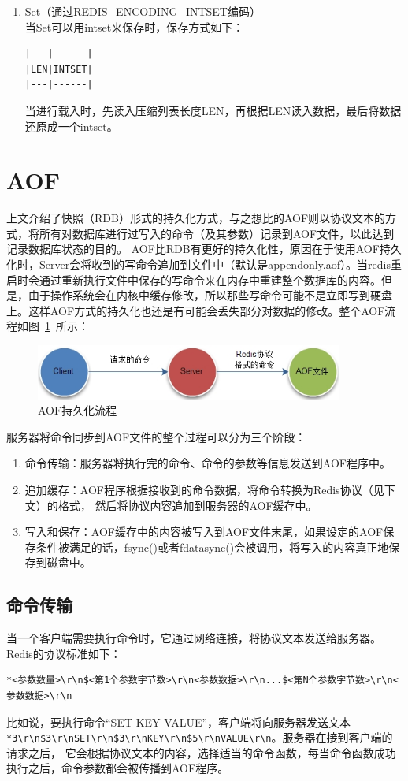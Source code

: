 \documentclass{zjutthesis}
\begin{document}
\begin{enumerate}[label=\arabic*.]
\item{
Set（通过REDIS\_ENCODING\_INTSET编码）\\
当Set可以用intset来保存时，保存方式如下：
\begin{verbatim}
|---|------|
|LEN|INTSET|
|---|------|
\end{verbatim}
当进行载入时，先读入压缩列表长度LEN，再根据LEN读入数据，最后将数据还原成一个intset。
}
\end{enumerate}


\section{AOF}
上文介绍了快照（RDB）形式的持久化方式，与之想比的AOF则以协议文本的方式，将所有对数据库进行过写入的命令（及其参数）记录到AOF文件，以此达到记录数据库状态的目的。
AOF比RDB有更好的持久化性，原因在于使用AOF持久化时，Server会将收到的写命令追加到文件中（默认是appendonly.aof）。当redis重启时会通过重新执行文件中保存的写命令来在内存中重建整个数据库的内容。但是，由于操作系统会在内核中缓存修改，所以那些写命令可能不是立即写到硬盘上。这样AOF方式的持久化也还是有可能会丢失部分对数据的修改。整个AOF流程如图~\ref{fig:AOF}~所示：
\begin{figure}[H]
\centering
\includegraphics[width=0.9\textwidth]{AOF}
\caption{AOF持久化流程}\label{fig:AOF}
\vspace{\baselineskip} %
\end{figure}

服务器将命令同步到AOF文件的整个过程可以分为三个阶段：
\begin{enumerate}[label=\arabic*.]
\item{命令传输：服务器将执行完的命令、命令的参数等信息发送到AOF程序中。}
\item{追加缓存：AOF程序根据接收到的命令数据，将命令转换为Redis协议（见下文）的格式，
然后将协议内容追加到服务器的AOF缓存中。}
\item{写入和保存：AOF缓存中的内容被写入到AOF文件末尾，如果设定的AOF保存条件被满足的话，fsync()或者fdatasync()会被调用，将写入的内容真正地保存到磁盘中。}
\end{enumerate}

\subsection{命令传输}
当一个客户端需要执行命令时，它通过网络连接，将协议文本发送给服务器。Redis的协议标准如下：
\begin{verbatim}
*<参数数量>\r\n$<第1个参数字节数>\r\n<参数数据>\r\n...$<第N个参数字节数>\r\n<参数数据>\r\n
\end{verbatim}
比如说，要执行命令“SET KEY VALUE”，客户端将向服务器发送文本\verb|*3\r\n$3\r\nSET\r\n$3\r\nKEY\r\n$5\r\nVALUE\r\n|。服务器在接到客户端的请求之后，
它会根据协议文本的内容，选择适当的命令函数，每当命令函数成功执行之后，命令参数都会被传播到AOF程序。
\end{document}
